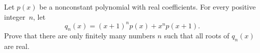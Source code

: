 Let \(p(x)\) be a nonconstant polynomial with real coefficients. For every positive integer~\(n\), let \[q_n(x) = (x+1)^np(x)+x^n p(x+1) .\]
Prove that there are only finitely many numbers \(n\) such that all roots of \(q_n(x)\) are real.